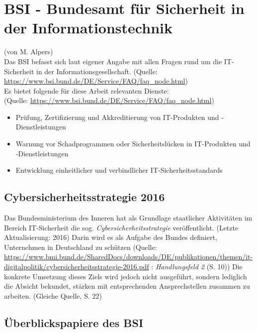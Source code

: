 \section{BSI - Bundesamt für Sicherheit in der Informationstechnik}
(von M. Alpers)\\

Das BSI befasst sich laut eigener Angabe \glqq{}mit allen Fragen rund um die IT-Sicherheit in der Informationsgesellschaft.\grqq{} (Quelle: \url{https://www.bsi.bund.de/DE/Service/FAQ/faq_node.html})\\

Es bietet folgende für diese Arbeit relevanten Dienste:\\
(Quelle: \url{https://www.bsi.bund.de/DE/Service/FAQ/faq_node.html})

\begin{itemize}
	\item \glqq{}Prüfung, Zertifizierung und Akkreditierung von IT-Produkten und -Dienstleistungen\grqq{}
	\item \glqq{}Warnung vor Schadprogrammen oder Sicherheitslücken in IT-Produkten und -Dienstleistungen\grqq{}
	\item \glqq{}Entwicklung einheitlicher und verbindlicher IT-Sicherheitsstandards\grqq{}
\end{itemize}

\subsection{Cybersicherheitsstrategie 2016}

Das Bundesministerium des Inneren hat als Grundlage staatlicher Aktivitäten im Bereich IT-Sicherheit die sog. \emph{Cybersicherheitsstrategie} veröffentlicht. (Letzte Aktualisierung: 2016) Darin wird es als Aufgabe des Bundes definiert, \glqq{}Unternehmen in Deutschland zu schützen\grqq{} (Quelle: \url{https://www.bmi.bund.de/SharedDocs/downloads/DE/publikationen/themen/it-digitalpolitik/cybersicherheitsstrategie-2016.pdf} : \emph{Handlungsfeld 2} (S. 10)) Die konkrete Umsetzung dieses Ziels wird jedoch nicht ausgeführt, sondern lediglich die Absicht bekundet, stärken mit entsprechenden Ansprechstellen zusammen zu arbeiten. (Gleiche Quelle, S. 22)\\

\subsection{Überblickspapiere des BSI}

